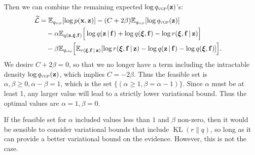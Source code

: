 Then we can combine the remaining expected $\log q_{\textsc{vgp}}(\boldsymbol{\mathbf{z}})$'s:
\begin{align*}
\widetilde{\mathcal{L}}
&=
\mathbb{E}_{q_{\textsc{vgp}}}[\log p(\boldsymbol{\mathbf{x}}, \boldsymbol{\mathbf{z}})]
- (C + 2\beta)
\mathbb{E}_{q_{\textsc{vgp}}}[
\log q_{\textsc{vgp}}(\boldsymbol{\mathbf{z}})
]
\\
&\quad
- \alpha\mathbb{E}_{q(\boldsymbol{\mathbf{z}},\boldsymbol{\mathbf{\xi}},\mathbf{f})}\Big[
\log q(\boldsymbol{\mathbf{z}}\,|\,\mathbf{f})
+
\log q(\boldsymbol{\mathbf{\xi}},\mathbf{f}) - \log r(\boldsymbol{\mathbf{\xi}},\mathbf{f}\,|\,\boldsymbol{\mathbf{z}})
\Big]
\\
&\quad
- \beta\mathbb{E}_{q_{\textsc{vgp}}}\Big[
\mathbb{E}_{r(\boldsymbol{\mathbf{\xi}},\mathbf{f}\,|\,\boldsymbol{\mathbf{z}})}[
\log r(\boldsymbol{\mathbf{\xi}},\mathbf{f}\,|\,\boldsymbol{\mathbf{z}})
-
\log q(\boldsymbol{\mathbf{z}}\,|\,\mathbf{f})
-
\log q(\boldsymbol{\mathbf{\xi}},\mathbf{f})
]
\Big]
.
\end{align*}
We desire $C+2\beta=0$, so that we no longer have a term including the
intractable density $\log q_{\textsc{vgp}}(\boldsymbol{\mathbf{z}})$, which implies $C=-2\beta$.
Thus the feasible set is $\alpha,\beta\ge 0, \alpha-\beta=1$, which is
the set $\{(\alpha\ge 1, \beta = \alpha-1)\}$.  Since $\alpha$ must be
at least 1, any larger value will lead to a strictly lower variational
bound.  Thus the optimal values are $\alpha=1,\beta=0$.

If the feasible set for $\alpha$ included values less than $1$ and
$\beta$ non-zero, then it would be sensible to consider variational
bounds that include $\operatorname{KL}(r\|q)$, so long as it can
provide a better variational bound on the evidence. However, this is
not the case.
\fi

